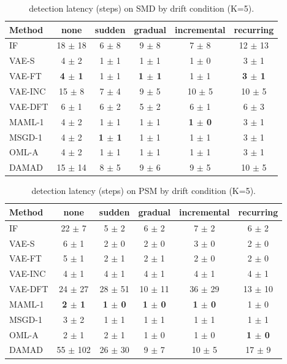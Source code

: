 \begin{table}[t]
\centering
\small
\caption{detection latency (steps) on SMD by drift condition (K=5).}
\label{tab:drift_latency_mean_smd}
\begin{tabular}{lccccc}
\toprule
Method & none & sudden & gradual & incremental & recurring \\
\midrule
IF & 18 $\pm$ 18 & 6 $\pm$ 8 & 9 $\pm$ 8 & 7 $\pm$ 8 & 12 $\pm$ 13 \\
VAE-S & 4 $\pm$ 2 & 1 $\pm$ 1 & 1 $\pm$ 1 & 1 $\pm$ 0 & 3 $\pm$ 1 \\
VAE-FT & \textbf{4 $\pm$ 1} & 1 $\pm$ 1 & \textbf{1 $\pm$ 1} & 1 $\pm$ 1 & \textbf{3 $\pm$ 1} \\
VAE-INC & 15 $\pm$ 8 & 7 $\pm$ 4 & 9 $\pm$ 5 & 10 $\pm$ 5 & 10 $\pm$ 5 \\
VAE-DFT & 6 $\pm$ 1 & 6 $\pm$ 2 & 5 $\pm$ 2 & 6 $\pm$ 1 & 6 $\pm$ 3 \\
MAML-1 & 4 $\pm$ 2 & 1 $\pm$ 1 & 1 $\pm$ 1 & \textbf{1 $\pm$ 0} & 3 $\pm$ 1 \\
MSGD-1 & 4 $\pm$ 2 & \textbf{1 $\pm$ 1} & 1 $\pm$ 1 & 1 $\pm$ 1 & 3 $\pm$ 1 \\
OML-A & 4 $\pm$ 2 & 1 $\pm$ 1 & 1 $\pm$ 1 & 1 $\pm$ 1 & 3 $\pm$ 1 \\
DAMAD & 15 $\pm$ 14 & 8 $\pm$ 5 & 9 $\pm$ 6 & 9 $\pm$ 5 & 10 $\pm$ 5 \\
\bottomrule
\end{tabular}
\end{table}

\begin{table}[t]
\centering
\small
\caption{detection latency (steps) on PSM by drift condition (K=5).}
\label{tab:drift_latency_mean_psm}
\begin{tabular}{lccccc}
\toprule
Method & none & sudden & gradual & incremental & recurring \\
\midrule
IF & 22 $\pm$ 7 & 5 $\pm$ 2 & 6 $\pm$ 2 & 7 $\pm$ 2 & 6 $\pm$ 2 \\
VAE-S & 6 $\pm$ 1 & 2 $\pm$ 0 & 2 $\pm$ 0 & 3 $\pm$ 0 & 2 $\pm$ 0 \\
VAE-FT & 5 $\pm$ 1 & 2 $\pm$ 1 & 2 $\pm$ 1 & 2 $\pm$ 0 & 2 $\pm$ 0 \\
VAE-INC & 4 $\pm$ 1 & 4 $\pm$ 1 & 4 $\pm$ 1 & 4 $\pm$ 1 & 4 $\pm$ 1 \\
VAE-DFT & 24 $\pm$ 27 & 28 $\pm$ 51 & 10 $\pm$ 11 & 36 $\pm$ 29 & 13 $\pm$ 10 \\
MAML-1 & \textbf{2 $\pm$ 1} & \textbf{1 $\pm$ 0} & \textbf{1 $\pm$ 0} & \textbf{1 $\pm$ 0} & 1 $\pm$ 0 \\
MSGD-1 & 3 $\pm$ 2 & 1 $\pm$ 1 & 1 $\pm$ 1 & 1 $\pm$ 1 & 1 $\pm$ 1 \\
OML-A & 2 $\pm$ 1 & 2 $\pm$ 1 & 1 $\pm$ 0 & 1 $\pm$ 0 & \textbf{1 $\pm$ 0} \\
DAMAD & 55 $\pm$ 102 & 26 $\pm$ 30 & 9 $\pm$ 7 & 10 $\pm$ 5 & 17 $\pm$ 9 \\
\bottomrule
\end{tabular}
\end{table}

